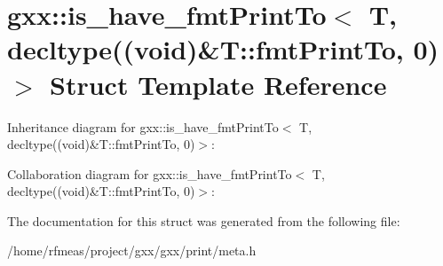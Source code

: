 \hypertarget{structgxx_1_1is__have__fmtPrintTo_3_01T_00_01decltype_07_07void_08_6T_1_1fmtPrintTo_00_010_08_4}{}\section{gxx\+:\+:is\+\_\+have\+\_\+fmt\+Print\+To$<$ T, decltype((void)\&T\+:\+:fmt\+Print\+To, 0)$>$ Struct Template Reference}
\label{structgxx_1_1is__have__fmtPrintTo_3_01T_00_01decltype_07_07void_08_6T_1_1fmtPrintTo_00_010_08_4}


Inheritance diagram for gxx\+:\+:is\+\_\+have\+\_\+fmt\+Print\+To$<$ T, decltype((void)\&T\+:\+:fmt\+Print\+To, 0)$>$\+:


Collaboration diagram for gxx\+:\+:is\+\_\+have\+\_\+fmt\+Print\+To$<$ T, decltype((void)\&T\+:\+:fmt\+Print\+To, 0)$>$\+:


The documentation for this struct was generated from the following file\+:\begin{DoxyCompactItemize}
\item 
/home/rfmeas/project/gxx/gxx/print/meta.\+h\end{DoxyCompactItemize}
